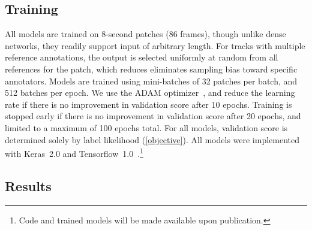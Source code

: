 \documentclass{article}
\begin{document}
\subsection{Training}
All models are trained on 8-second patches (86 frames), though unlike dense networks, they readily support input of arbitrary length.
For tracks with multiple reference annotations, the output is selected uniformly at random from all references for the patch, which reduces eliminates sampling bias toward specific annotators.
Models are trained using mini-batches of 32 patches per batch, and 512 batches per epoch.
We use the ADAM optimizer~\cite{kingma2014adam}, and reduce the learning rate if there is no improvement in validation score after 10 epochs.
Training is stopped early if there is no improvement in validation score after 20 epochs, and limited to a maximum of 100 epochs total.
For all models, validation score is determined solely by label likelihood (\cref{objective}).
All models were implemented with Keras~2.0 and Tensorflow~1.0~\cite{chollet2015keras, tensorflow2015-whitepaper}.\footnote{Code and trained models will be made available upon publication.}

\subsection{Results}
\end{document}
